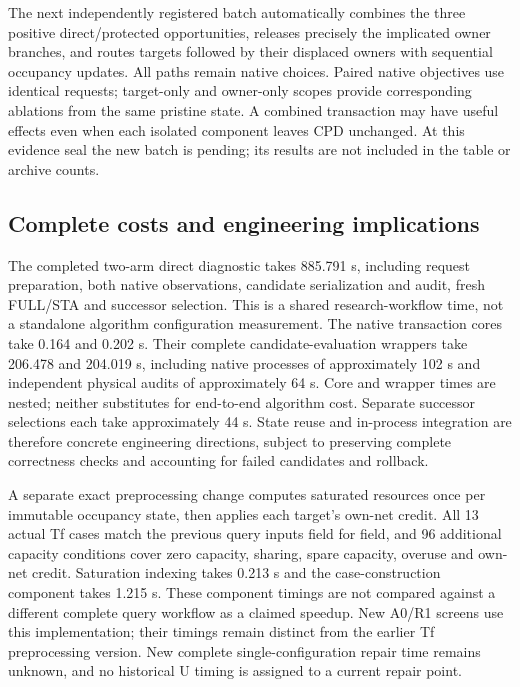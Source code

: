 The next independently registered batch automatically combines the three positive direct/protected opportunities, releases precisely the implicated owner branches, and routes targets followed by their displaced owners with sequential occupancy updates. All paths remain native choices. Paired native objectives use identical requests; target-only and owner-only scopes provide corresponding ablations from the same pristine state. A combined transaction may have useful effects even when each isolated component leaves CPD unchanged. At this evidence seal the new batch is pending; its results are not included in the table or archive counts.

\subsection{Complete costs and engineering implications}
The completed two-arm direct diagnostic takes 885.791 s, including request preparation, both native observations, candidate serialization and audit, fresh FULL/STA and successor selection. This is a shared research-workflow time, not a standalone algorithm configuration measurement. The native transaction cores take 0.164 and 0.202 s. Their complete candidate-evaluation wrappers take 206.478 and 204.019 s, including native processes of approximately 102 s and independent physical audits of approximately 64 s. Core and wrapper times are nested; neither substitutes for end-to-end algorithm cost. Separate successor selections each take approximately 44 s. State reuse and in-process integration are therefore concrete engineering directions, subject to preserving complete correctness checks and accounting for failed candidates and rollback.

A separate exact preprocessing change computes saturated resources once per immutable occupancy state, then applies each target's own-net credit. All 13 actual Tf cases match the previous query inputs field for field, and 96 additional capacity conditions cover zero capacity, sharing, spare capacity, overuse and own-net credit. Saturation indexing takes 0.213 s and the case-construction component takes 1.215 s. These component timings are not compared against a different complete query workflow as a claimed speedup. New A0/R1 screens use this implementation; their timings remain distinct from the earlier Tf preprocessing version. New complete single-configuration repair time remains unknown, and no historical U timing is assigned to a current repair point.
